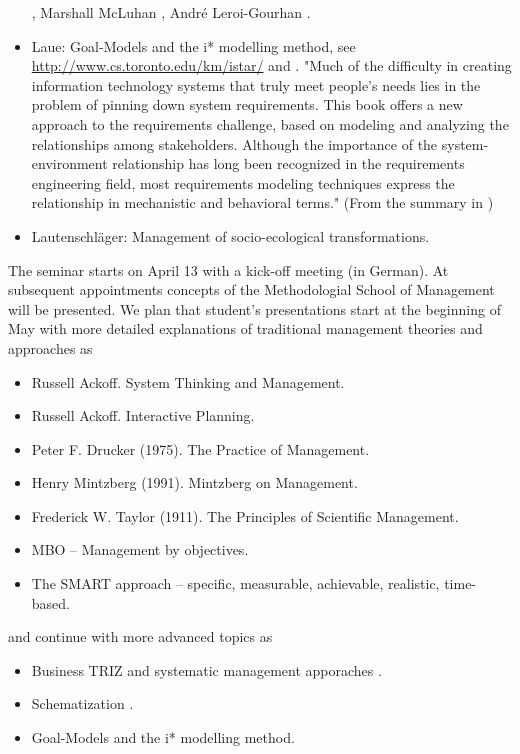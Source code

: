 \documentclass[11pt,a4paper]{article}
\begin{document}
\begin{itemize}
  \cite{Cassirer1930}, Marshall McLuhan \cite{McLuhan1964}, André
  Leroi-Gourhan \cite{LeroiGourhan1993}.
\item Laue: Goal-Models and the i* modelling method, see
  \url{http://www.cs.toronto.edu/km/istar/} and \cite{Yu2010}.  "Much of the
  difficulty in creating information technology systems that truly meet
  people's needs lies in the problem of pinning down system requirements. This
  book offers a new approach to the requirements challenge, based on modeling
  and analyzing the relationships among stakeholders. Although the importance
  of the system-environment relationship has long been recognized in the
  requirements engineering field, most requirements modeling techniques
  express the relationship in mechanistic and behavioral terms." (From the
  summary in \cite{Yu2010})
\item Lautenschläger: Management of socio-ecological transformations. 
\end{itemize}

The seminar starts on April 13 with a kick-off meeting (in German). At
subsequent appointments concepts of the Methodologial School of Management
will be presented. We plan that student's presentations start at the beginning
of May with more detailed explanations of traditional management theories and
approaches as 
\begin{itemize}[noitemsep]
\item Russell Ackoff. System Thinking and Management. 
\item Russell Ackoff. Interactive Planning.
\item Peter F. Drucker (1975). The Practice of Management.
\item Henry Mintzberg (1991). Mintzberg on Management.
\item Frederick W. Taylor (1911).  The Principles of Scientific Management.
\item MBO -- Management by objectives.
\item The SMART approach -- specific, measurable, achievable, realistic,
  time-based. 
\end{itemize}
and continue with more advanced topics as
\begin{itemize}[noitemsep]
\item Business TRIZ and systematic management apporaches \cite{Souchkov2010}. 
\item Schematization \cite{Kozhemyako2019}.
\item Goal-Models and the i* modelling method.
\end{itemize}
\end{document}
